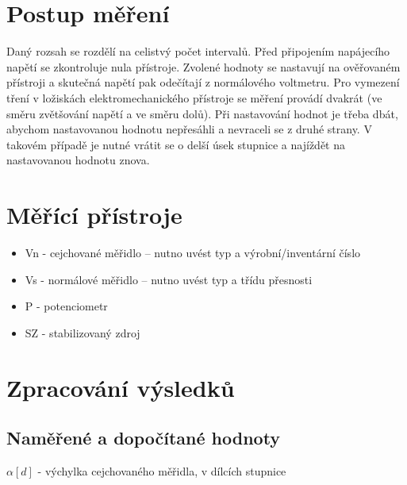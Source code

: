 \documentclass[12pt,a4paper]{report}
\begin{document}
\section*{Postup měření}
Daný rozsah se rozdělí na celistvý počet intervalů. Před připojením napájecího 
napětí se zkontroluje nula přístroje.
Zvolené hodnoty se nastavují na ověřovaném přístroji a skutečná napětí pak odečítají 
z
normálového voltmetru. Pro vymezení tření v
ložiskách elektromechanického přístroje se 
měření provádí dvakrát (ve směru zvětšování napětí a ve směru dolů). Při nastavování hodnot 
je třeba dbát, abychom nastavovanou hodnotu nepřesáhli a nevraceli se z
druhé strany. V 
takovém případě je nutné vrátit se o delší úsek stupnice a najíždět na nastavovanou hodnotu 
znova. 
\section*{Měřící přístroje}
\begin{itemize}
    \item Vn - cejchované měřidlo – nutno uvést typ a výrobní/inventární číslo
    \item Vs - normálové měřidlo – nutno uvést typ a třídu přesnosti
    \item P  - potenciometr
    \item SZ - stabilizovaný zdroj
\end{itemize}

\section*{Zpracování výsledků}
\subsection*{Naměřené a dopočítané hodnoty}

\noindent
    $\alpha[d]$ - výchylka cejchovaného měřidla, v
dílcích stupnice \\
\end{document}
